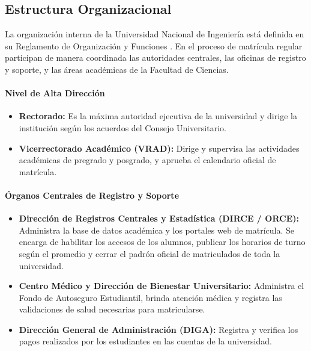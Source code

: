 \subsection{Estructura Organizacional}

La organización interna de la Universidad Nacional de Ingeniería está definida en su Reglamento de Organización y Funciones \cite{rof2023}. En el proceso de matrícula regular participan de manera coordinada las autoridades centrales, las oficinas de registro y soporte, y las áreas académicas de la Facultad de Ciencias.

\paragraph{Nivel de Alta Dirección}
\begin{itemize}
    \item \textbf{Rectorado:} Es la máxima autoridad ejecutiva de la universidad y dirige la institución según los acuerdos del Consejo Universitario.
    \item \textbf{Vicerrectorado Académico (VRAD):} Dirige y supervisa las actividades académicas de pregrado y posgrado, y aprueba el calendario oficial de matrícula.
\end{itemize}

\paragraph{Órganos Centrales de Registro y Soporte}
\begin{itemize}
    \item \textbf{Dirección de Registros Centrales y Estadística (DIRCE / ORCE):} Administra la base de datos académica y los portales web de matrícula. Se encarga de habilitar los accesos de los alumnos, publicar los horarios de turno según el promedio y cerrar el padrón oficial de matriculados de toda la universidad.
    \item \textbf{Centro Médico y Dirección de Bienestar Universitario:} Administra el Fondo de Autoseguro Estudiantil, brinda atención médica y registra las validaciones de salud necesarias para matricularse.
    \item \textbf{Dirección General de Administración (DIGA):} Registra y verifica los pagos realizados por los estudiantes en las cuentas de la universidad.
\end{itemize}

